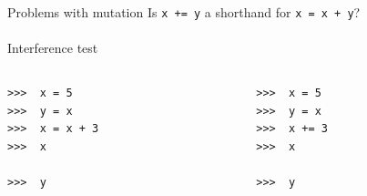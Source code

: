 \documentclass{beamer}
\newcommand{\prompt}{\phantom{}>\phantom{}>\phantom{}>\ }
\begin{document}
\begin{frame}{Problems with mutation} 
  Is \texttt{x += y} a shorthand for \texttt{x = x + y}? \\
  \ \\
  Interference test \\ \pause
  \begin{columns}[T] %
    \begin{column}{.48\textwidth}
      \begin{small}
        \texttt{\prompt{} x = 5\\ \pause
          \prompt{} y = x\\ \pause
          \prompt{} x = x + 3 \\ \pause
          \prompt{} x \\ \\ \pause
          \prompt{} y \\  \\
          \ \\
          \ \\
          \ \pause
        }
      \end{small}
    \end{column}%
    \hfill%
    \begin{column}{.48\textwidth}
      \begin{small}
        \texttt{\prompt{} x = 5\\ \pause
          \prompt{} y = x\\ \pause
          \prompt{} x += 3 \\ \pause
          \prompt{} x \\ \\ \pause
          \prompt{} y\\  \\
          \ \\
          \ \\
          \ 
        }
      \end{small}
    \end{column}
  \end{columns} 
\end{frame}
\end{document}
